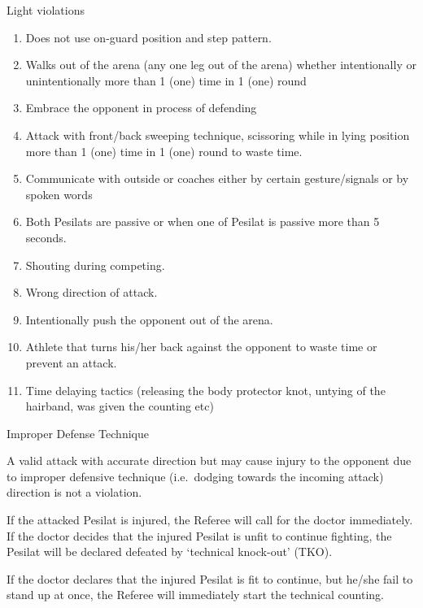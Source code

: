 \begin{legal}
\begin{legal}
\begin{legal}
        \item Light violations
            \begin{enumerate}[label=\alph*.]
            \item Does not use on-guard position and step pattern.
            \item Walks out of the arena (any one leg out of the arena) whether intentionally
                  or unintentionally more than 1 (one) time in 1 (one) round
            \item Embrace the opponent in process of defending
            \item Attack with front/back sweeping technique, scissoring while in lying
                  position more than 1 (one) time in 1 (one) round to waste time.
            \item Communicate with outside or coaches either by certain gesture/signals or
by spoken words
            \item Both Pesilats are passive or when one of Pesilat is passive more than 5
seconds.
            \item  Shouting during competing.
            \item Wrong direction of attack.
            \item Intentionally push the opponent out of the arena.
            \item Athlete that turns his/her back against the opponent to waste time or
                  prevent an attack.
            \item Time delaying tactics (releasing the body protector knot, untying of the
hairband, was given the counting etc)
            \end{enumerate}

        \end{legal}

    \item Improper Defense Technique
        \begin{legal}
        \item A valid attack with accurate direction but may cause injury to the opponent 
             due to improper defensive technique (i.e.\ dodging towards the incoming attack)
             direction is not a violation.
        \item If the attacked Pesilat is injured, the Referee will call for the doctor
              immediately. If the doctor decides that the injured Pesilat is unfit to continue fighting,
              the Pesilat will be declared defeated by `technical knock-out' (TKO).
        \item If the doctor declares that the injured Pesilat is fit to continue, but he/she fail
              to stand up at once, the Referee will immediately start the technical counting.
        \end{legal}


\end{legal}
\end{legal}
